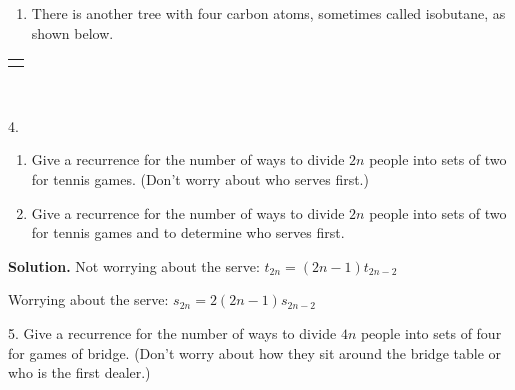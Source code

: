 \documentclass[10pt,]{book}
\theoremstyle{plain}
\theoremstyle{definition}
\theoremstyle{definition}
\numberwithin{equation}{chapter}
\newlength{\panelmax}
\begin{document}
\begin{exerciselist}
\begin{enumerate}[label=(\alph*)]
\item\hypertarget{li-35}{}There is another tree with four carbon atoms, sometimes called isobutane, as shown below.%
\end{enumerate}
%
{%
\setlength{\panelmax}{0pt}
\newsavebox{\panelboxUimage}
\newlength{\phUimage}\setlength{\phUimage}{\ht\panelboxUimage+\dp\panelboxUimage}
\settototalheight{\phUimage}{\usebox{\panelboxUimage}}
\setlength{\panelmax}{\maxof{\panelmax}{\phUimage}}
\leavevmode%
\setlength{\tabcolsep}{0\linewidth}
\par\medskip\noindent
\begin{tabular}{@{}*{1}{c}@{}}
\begin{minipage}[c][\panelmax][t]{1\linewidth}\usebox{\panelboxUimage}\end{minipage}\end{tabular}\\
}%
\item[4.]\hypertarget{exercise-16}{}\leavevmode%
\begin{enumerate}[label=(\alph*)]
\item\hypertarget{li-36}{}Give a recurrence for the number of ways to divide \(2n\) people into sets of two for tennis games.  (Don't worry about who serves first.)%
\item\hypertarget{li-37}{}Give a recurrence for the number of ways to divide \(2n\) people into sets of two for tennis games and to determine who serves first.%
\end{enumerate}
%
\par\smallskip
\par\smallskip
\noindent\textbf{Solution.}\hypertarget{solution-183}{}\quad
Not worrying about the serve: \(t_{2n}=(2n-1)t_{2n-2}\)%
\par
Worrying about the serve: \(s_{2n}=2(2n-1)s_{2n-2}\)%
\item[5.]\hypertarget{exercise-17}{}Give a recurrence for the number of ways to divide \(4n\) people into sets of four for games of bridge.  (Don't worry about how they sit around the bridge table or who is the first dealer.)%

\end{exerciselist}
\end{document}
